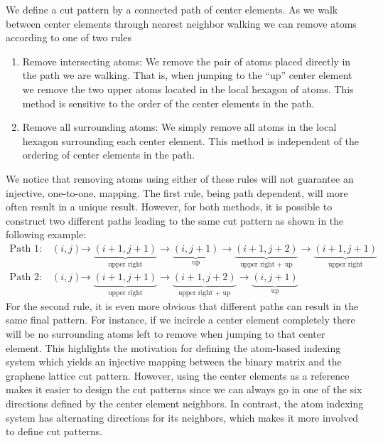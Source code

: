 We define a cut pattern by a connected path of center elements. As
we walk between center elements through nearest neighbor walking we can remove atoms according to one of two rules 
\begin{enumerate}
  \item Remove intersecting atoms: We remove the pair of atoms placed directly
  in the path we are walking. That is, when jumping to the ``up'' center
  element we remove the two upper atoms located in the local hexagon of atoms.
  This method is sensitive to the order of the center elements in the path. 
  \item Remove all surrounding atoms: We simply remove all atoms in the local
  hexagon surrounding each center element. This method is independent of the
  ordering of center elements in the path.
\end{enumerate}
We notice that removing atoms using either of these rules will not guarantee an injective, one-to-one, mapping. The first rule, being path dependent, will more often result in a unique result. However, for both methods, it is possible to construct two different paths leading to the same cut pattern as shown in the following example:
\begin{align*}
  \text{Path 1:} \quad (i, j) &\rightarrow \underbrace{(i+1,j+1)}_{\text{upper right}} \rightarrow \underbrace{(i, j+1)}_{\text{up}} \rightarrow \underbrace{(i+1, j+2)}_{\text{upper right + up}} \rightarrow \underbrace{(i+1, j+1)}_{\text{upper right}} \\
  \text{Path 2:} \quad (i, j) &\rightarrow \underbrace{(i+1,j+1)}_{\text{upper right}} \rightarrow \underbrace{(i+1, j+2)}_{\text{upper right + up}} \rightarrow \underbrace{(i, j+1)}_{\text{up}}
\end{align*}
For the second rule, it is even more obvious that different paths can result in the same final pattern. For instance, if we incircle a center element completely there will be no surrounding atoms left to remove when jumping to that center element. This highlights the motivation for defining the atom-based indexing system which yields an injective mapping between the binary matrix and the graphene lattice cut pattern. However, using the center elements as a reference makes it easier to design the cut patterns since we can always go in one of the six directions defined by the center element neighbors. In contrast, the atom indexing system has alternating directions for its neighbors, which makes it more involved to define cut patterns.



